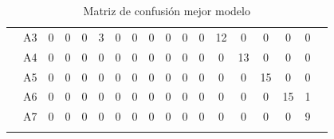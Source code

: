 \documentclass[12pt]{article}
\begin{document}
\begin{table}[!ht]
{\begin{tabular}{cccccccccccccccccc}
			& \multicolumn{1}{c|}{A3} & \multicolumn{1}{c|}{0} & \multicolumn{1}{c|}{0} & \multicolumn{1}{c|}{0} & \multicolumn{1}{c|}{3}  & \multicolumn{1}{c|}{0}  & \multicolumn{1}{c|}{0}  & \multicolumn{1}{c|}{0}  & \multicolumn{1}{c|}{0}  & \multicolumn{1}{c|}{0}  & \multicolumn{1}{c|}{0}  & \multicolumn{1}{c|}{12} & \multicolumn{1}{c|}{0}  & \multicolumn{1}{c|}{0}  & \multicolumn{1}{c|}{0}  & \multicolumn{1}{c|}{0} &  \\ \cline{3-17}
			& \multicolumn{1}{c|}{A4} & \multicolumn{1}{c|}{0} & \multicolumn{1}{c|}{0} & \multicolumn{1}{c|}{0} & \multicolumn{1}{c|}{0}  & \multicolumn{1}{c|}{0}  & \multicolumn{1}{c|}{0}  & \multicolumn{1}{c|}{0}  & \multicolumn{1}{c|}{0}  & \multicolumn{1}{c|}{0}  & \multicolumn{1}{c|}{0}  & \multicolumn{1}{c|}{0}  & \multicolumn{1}{c|}{13} & \multicolumn{1}{c|}{0}  & \multicolumn{1}{c|}{0}  & \multicolumn{1}{c|}{0} &  \\ \cline{3-17}
			& \multicolumn{1}{c|}{A5} & \multicolumn{1}{c|}{0} & \multicolumn{1}{c|}{0} & \multicolumn{1}{c|}{0} & \multicolumn{1}{c|}{0}  & \multicolumn{1}{c|}{0}  & \multicolumn{1}{c|}{0}  & \multicolumn{1}{c|}{0}  & \multicolumn{1}{c|}{0}  & \multicolumn{1}{c|}{0}  & \multicolumn{1}{c|}{0}  & \multicolumn{1}{c|}{0}  & \multicolumn{1}{c|}{0}  & \multicolumn{1}{c|}{15} & \multicolumn{1}{c|}{0}  & \multicolumn{1}{c|}{0} &  \\ \cline{3-17}
			& \multicolumn{1}{c|}{A6} & \multicolumn{1}{c|}{0} & \multicolumn{1}{c|}{0} & \multicolumn{1}{c|}{0} & \multicolumn{1}{c|}{0}  & \multicolumn{1}{c|}{0}  & \multicolumn{1}{c|}{0}  & \multicolumn{1}{c|}{0}  & \multicolumn{1}{c|}{0}  & \multicolumn{1}{c|}{0}  & \multicolumn{1}{c|}{0}  & \multicolumn{1}{c|}{0}  & \multicolumn{1}{c|}{0}  & \multicolumn{1}{c|}{0}  & \multicolumn{1}{c|}{15} & \multicolumn{1}{c|}{1} &  \\ \cline{3-17}
			& \multicolumn{1}{c|}{A7} & \multicolumn{1}{c|}{0} & \multicolumn{1}{c|}{0} & \multicolumn{1}{c|}{0} & \multicolumn{1}{c|}{0}  & \multicolumn{1}{c|}{0}  & \multicolumn{1}{c|}{0}  & \multicolumn{1}{c|}{0}  & \multicolumn{1}{c|}{0}  & \multicolumn{1}{c|}{0}  & \multicolumn{1}{c|}{0}  & \multicolumn{1}{c|}{0}  & \multicolumn{1}{c|}{0}  & \multicolumn{1}{c|}{0}  & \multicolumn{1}{c|}{0}  & \multicolumn{1}{c|}{9} &  \\ \cline{3-17}
			&                         &                        &                        &                        &                         &                         &                         &                         &                         &                         &                         &                         &                         &                         &                         &                        & 
		\end{tabular}
	}
	\caption{Matriz de confusión mejor modelo}
	\label{tab:confusion_matrix_2}
\end{table}
\end{document}
